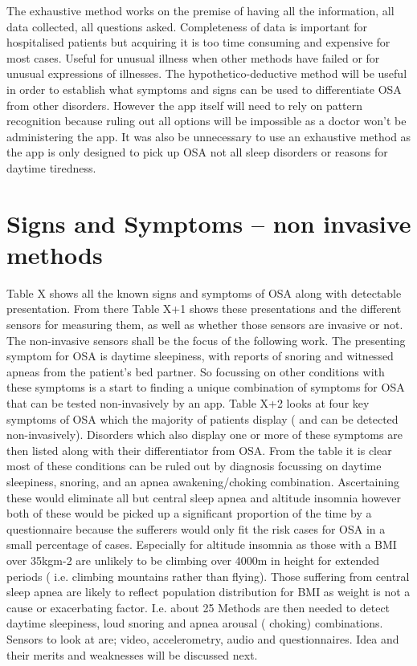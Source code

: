 The exhaustive method works on the premise of having all the information, all data collected, all questions asked. Completeness of data is important for hospitalised patients but acquiring it is too time consuming and expensive for most cases. Useful for unusual illness when other methods have failed or for unusual expressions of illnesses. 
The hypothetico-deductive method will be useful in order to establish what symptoms and signs can be used to differentiate OSA from other disorders. However the app itself will need to rely on pattern recognition because ruling out all options will be impossible as a doctor won’t be administering the app. It was also be unnecessary to use an exhaustive method as the app is only designed to pick up OSA not all sleep disorders or reasons for daytime tiredness. 

\section{Signs and Symptoms – non invasive methods}
Table X shows all the known signs and symptoms of OSA along with detectable presentation. From there Table X+1 shows these presentations and the different sensors for measuring them, as well as whether those sensors are invasive or not. The non-invasive sensors shall be the focus of the following work. The presenting symptom for OSA is daytime sleepiness, with reports of snoring and witnessed apneas from the patient’s bed partner. So focussing on other conditions with these symptoms is a start to finding a unique combination of symptoms for OSA that can be tested non-invasively by an app. 
Table X+2 looks at four key symptoms of OSA which the majority of patients display ( and can be detected non-invasively). Disorders which also display one or more of these symptoms are then listed along with their differentiator from OSA. From the table it is clear most of these conditions can be ruled out by diagnosis focussing on daytime sleepiness, snoring, and an apnea awakening/choking combination. 
Ascertaining these would eliminate all but central sleep apnea and altitude insomnia however both of these would be picked up a significant proportion of the time by a questionnaire because the sufferers would only fit the risk cases for OSA in a small percentage of cases. Especially for altitude insomnia as those with a BMI over 35kgm-2 are unlikely to be climbing over 4000m in height for extended periods ( i.e. climbing mountains rather than flying).
Those suffering from central sleep apnea are likely to reflect population distribution for BMI as weight is not a cause or exacerbating factor. I.e. about 25%
Methods are then needed to detect daytime sleepiness, loud snoring and apnea arousal ( choking) combinations. Sensors to look at are; video, accelerometry, audio and questionnaires. Idea and their merits and weaknesses will be discussed next.

